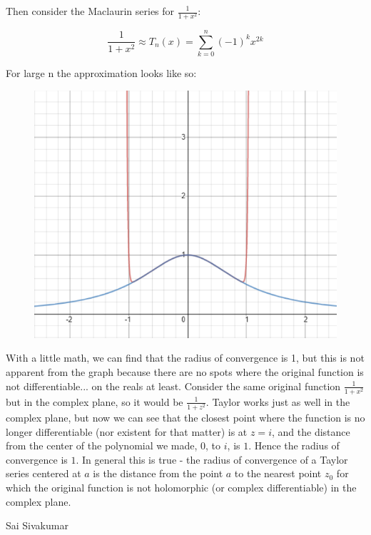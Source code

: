 \documentclass[11pt]{article}
\begin{document}
Then consider the Maclaurin series for $\frac{1}{1+x^2}$:

$$\frac{1}{1+x^2} \approx T_n(x) = \sum_{k=0}^{n}\left(-1\right)^{k}x^{2k}$$

For large n the approximation looks like so:

\begin{figure}[h]
\centering
\includegraphics[scale=1]{darctan}
\end{figure}

With a little math, we can find that the radius of convergence is 1, but this is not apparent from the graph because there are no spots where the original function is not differentiable... on the reals at least. Consider the same original function $\frac{1}{1+x^2}$ but in the complex plane, so it would be $\frac{1}{1+z^2}$. Taylor works just as well in the complex plane, but now we can see that the closest point where the function is no longer differentiable (nor existent for that matter) is at $z=i$, and the distance from the center of the polynomial we made, $0$, to $i$, is $1$. Hence the radius of convergence is $1$. In general this is true - the radius of convergence of a Taylor series centered at $a$ is the distance from the point $a$ to the nearest point $z_0$ for which the original function is not holomorphic (or complex differentiable) in the complex plane.

\begin{flushright}
Sai Sivakumar
\end{flushright}
\end{document}
